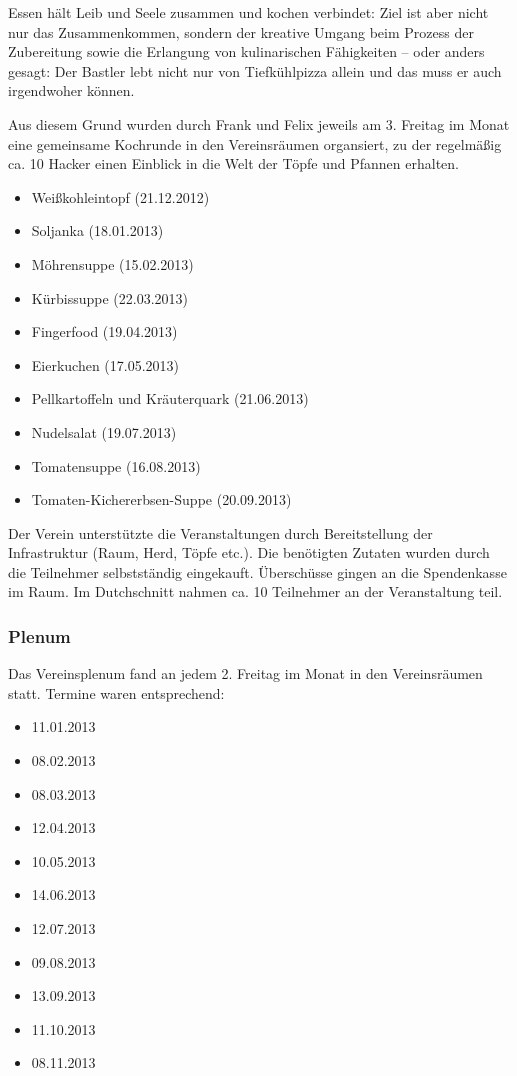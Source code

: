 \documentclass[10pt,DIV16]{scrartcl}
\begin{document}
Essen hält Leib und Seele zusammen und kochen verbindet:
Ziel ist aber nicht nur das Zusammenkommen, sondern der kreative Umgang
beim Prozess der Zubereitung sowie die Erlangung von kulinarischen
Fähigkeiten -- oder anders gesagt: Der Bastler lebt nicht nur von
Tiefkühlpizza allein und das muss er auch irgendwoher können.

Aus diesem Grund wurden durch Frank und Felix jeweils am 3. Freitag
im Monat eine gemeinsame Kochrunde in den Vereinsräumen organsiert,
zu der regelmäßig ca. 10 Hacker einen Einblick in die Welt der Töpfe
und Pfannen erhalten.

\begin{itemize}
	\item Weißkohleintopf (21.12.2012)
	\item Soljanka (18.01.2013)
	\item Möhrensuppe (15.02.2013)
	\item Kürbissuppe (22.03.2013)
	\item Fingerfood (19.04.2013)
	\item Eierkuchen (17.05.2013)
	\item Pellkartoffeln und Kräuterquark (21.06.2013)
	\item Nudelsalat (19.07.2013)
	\item Tomatensuppe (16.08.2013)
	\item Tomaten-Kichererbsen-Suppe (20.09.2013)
\end{itemize}

Der Verein unterstützte die Veranstaltungen durch Bereitstellung der
Infrastruktur (Raum, Herd, Töpfe etc.). Die benötigten Zutaten wurden
durch die Teilnehmer selbstständig eingekauft. Überschüsse gingen an
die Spendenkasse im Raum. Im Dutchschnitt nahmen ca. 10 Teilnehmer an
der Veranstaltung teil.

\subsubsection{Plenum}

Das Vereinsplenum fand an jedem 2. Freitag im Monat in den
Vereinsräumen statt. Termine waren entsprechend:

\begin{itemize}
	\item 11.01.2013
	\item 08.02.2013
	\item 08.03.2013
	\item 12.04.2013
	\item 10.05.2013
	\item 14.06.2013
	\item 12.07.2013
	\item 09.08.2013
	\item 13.09.2013
	\item 11.10.2013
	\item 08.11.2013
\end{itemize}
\end{document}
